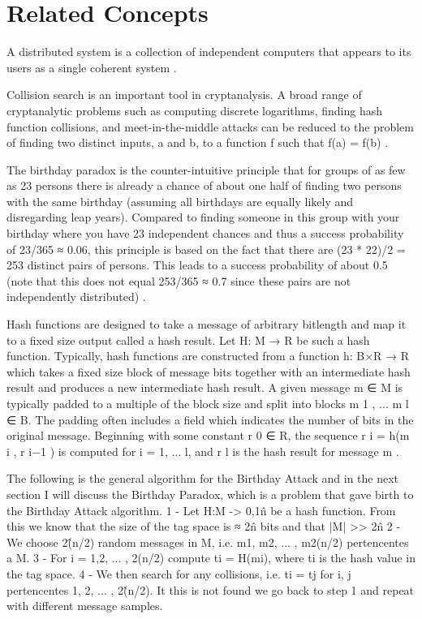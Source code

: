 \documentclass[letterpaper,conference]{IEEEtran}
\begin{document}
\section{Related Concepts} 

A distributed system is a collection of independent computers that appears to its users as a single 
coherent system \cite{tanenbaum2002distributed}.

Collision search is an important tool in cryptanalysis. A broad range of cryptanalytic problems
such as computing discrete logarithms, finding hash function collisions, and meet-in-the-middle
attacks can be reduced to the problem of finding two distinct inputs, a and b, to a function f such
that f(a) = f(b) \cite{van1999parallel}.

The birthday paradox is the counter-intuitive principle that for
groups of as few as 23 persons there is already a chance of about one half of finding two 
persons with the same birthday (assuming all birthdays are equally likely and disregarding 
leap years). Compared to finding someone in this group with your birthday where you have 
23 independent chances and thus a success probability of 23/365 ≈ 0.06, this principle is 
based on the fact that there are (23 * 22)/2 = 253 distinct pairs of persons. This leads to 
a success probability of about 0.5 (note that this does not equal 253/365 ≈ 0.7 since these 
pairs are not independently distributed) \cite{stevens2012attacks}.

Hash functions are designed to take a message of arbitrary bitlength and map it to a fixed size
output called a hash result. Let H: M → R be such a hash function. Typically, hash functions are
constructed from a function h: B×R → R which takes a fixed size block of message bits together
with an intermediate hash result and produces a new intermediate hash result. A given message
m ∈ M is typically padded to a multiple of the block size and split into blocks m 1 , ... m l ∈ B. The
padding often includes a field which indicates the number of bits in the original message.
Beginning with some constant r 0 ∈ R, the sequence r i = h(m i , r i−1 ) is computed for i = 1, ... l, and
r l is the hash result for message m \cite{van1999parallel}.

The following is the general algorithm for the Birthday Attack and in the next section I will discuss
the Birthday Paradox, which is a problem that gave birth to the Birthday Attack algorithm.
1 - Let H:M -> {0,1}\^n be a hash function. From this we know that the size of the tag space is ≈ 2\^n bits
and that |M| >> 2\^n
2 - We choose 2\^(n/2) random messages in M, i.e. m1, m2, ... , m2(n/2) pertencentes a M.
3 - For i = 1,2, ... , 2(n/2) compute ti = H(mi), where ti is the hash value in the tag space.
4 - We then search for any collisions, i.e. ti = tj for i, j pertencentes {1, 2, ... , 2\^(n/2)}. It this is not
found we go back to step 1 and repeat with different message samples.
 
\end{document}
